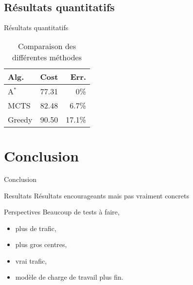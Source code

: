 \documentclass[tikz]{beamer}
\begin{document}
\subsection{Résultats quantitatifs}
\begin{frame}[c]{Résultats quantitatifs}
\begin{table}
  \centering
  \begin{tabulary}
    {\textwidth}{LRR}
    Alg.    & Cost  & Err.   \\
    \toprule
    A\(^*\) & 77.31 & 0\%    \\
    MCTS    & 82.48 & 6.7\%  \\
    Greedy  & 90.50 & 17.1\% \\
  \end{tabulary}
  \caption{Comparaison des différentes méthodes}\label{tab:methods_compare}
\end{table}
\end{frame}
\section*{Conclusion}
\begin{frame}[c]{Conclusion}
  \begin{block}{Resultats}
    Résultats encourageants mais pas vraiment concrets
  \end{block}
  \begin{block}{Perspectives}
    Beaucoup de tests à faire,
    \begin{itemize}
      \item plus de trafic,
      \item plus gros centres,
      \item vrai trafic,
      \item modèle de charge de travail plus fin.
    \end{itemize}
  \end{block}
\end{frame}
\end{document}
